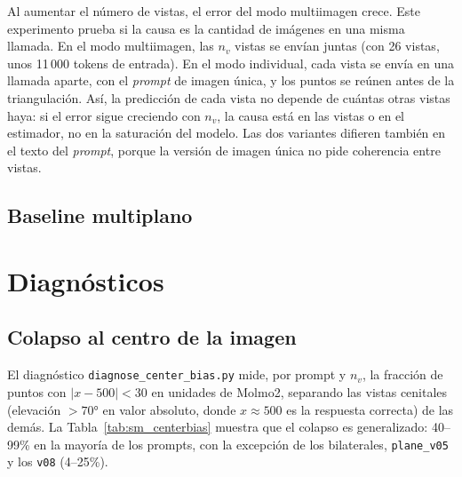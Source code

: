 Al aumentar el número de vistas, el error del modo multiimagen crece. Este
experimento prueba si la causa es la cantidad de imágenes en una misma llamada. En
el modo multiimagen, las $n_v$ vistas se envían juntas (con 26 vistas, unos 11\,000
tokens de entrada). En el modo individual, cada vista se envía en una llamada
aparte, con el \textit{prompt} de imagen única, y los puntos se reúnen antes de la
triangulación. Así, la predicción de cada vista no depende de cuántas otras vistas
haya: si el error sigue creciendo con $n_v$, la causa está en las vistas o en el
estimador, no en la saturación del modelo. Las dos variantes difieren también en el
texto del \textit{prompt}, porque la versión de imagen única no pide coherencia
entre vistas.




\newpage
\subsection{Baseline multiplano}







\newpage
\section{Diagnósticos}


\subsection{Colapso al centro de la imagen}
\label{sec:sm_diag_centro}

El diagnóstico \texttt{diagnose\_center\_bias.py} mide, por prompt y $n_v$, la
fracción de puntos con $|x-500|<30$ en unidades de Molmo2, separando las vistas
cenitales (elevación $>70°$ en valor absoluto, donde $x\approx 500$ es la respuesta
correcta) de las demás. La Tabla~\ref{tab:sm_centerbias} muestra que el colapso es
generalizado: 40--99\% en la mayoría de los prompts, con la excepción de los
bilaterales, \texttt{plane\_v05} y los \texttt{v08} (4--25\%).

